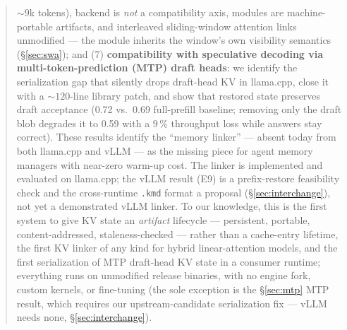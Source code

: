 \documentclass[11pt]{article}
\newcommand{\code}[1]{\texttt{#1}}
\begin{document}
\begin{abstract}
${\sim}9$k tokens), backend is \emph{not} a compatibility axis, modules are machine-portable artifacts, and interleaved sliding-window attention links unmodified --- the module inherits the window's own visibility semantics (\S\ref{sec:swa}); and (7) \textbf{compatibility with speculative decoding via multi-token-prediction (MTP) draft heads}: we identify the serialization gap that silently drops draft-head KV in llama.cpp, close it with a ${\sim}120$-line library patch, and show that restored state preserves draft acceptance (0.72 vs.\ 0.69 full-prefill baseline; removing only the draft blob degrades it to 0.59 with a 9\,\% throughput loss while answers stay correct). These results identify the ``memory linker'' --- absent today from both llama.cpp and vLLM --- as the missing piece for agent memory managers with near-zero warm-up cost. The linker is implemented and evaluated on llama.cpp; the vLLM result (E9) is a prefix-restore feasibility check and the cross-runtime \code{.kmd} format a proposal (\S\ref{sec:interchange}), not yet a demonstrated vLLM linker. To our knowledge, this is the first system to give KV state an \emph{artifact} lifecycle --- persistent, portable, content-addressed, staleness-checked --- rather than a cache-entry lifetime, the first KV linker of any kind for hybrid linear-attention models, and the first serialization of MTP draft-head KV state in a consumer runtime; everything runs on unmodified release binaries, with no engine fork, custom kernels, or fine-tuning (the sole exception is the \S\ref{sec:mtp} MTP result, which requires our upstream-candidate serialization fix --- vLLM needs none, \S\ref{sec:interchange}).
\end{abstract}
\end{document}
